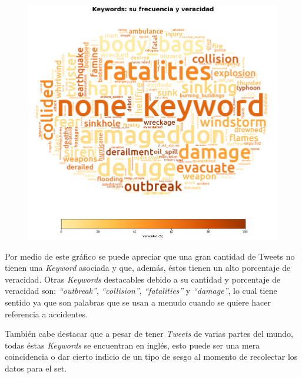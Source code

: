 \documentclass[titlepage,a4paper]{article}
\begin{document}
    \begin{figure}[H]
    \centering
    \includegraphics[width=1\textwidth]{graficos/Analisis de Keyword/keywords_frec_y_veracidad.png}
    \caption{} 
    \end{figure}
    
    Por medio de este gráfico se puede apreciar que una gran cantidad de Tweets no tienen una \textit{Keyword} asociada y que, además, éstos tienen un alto porcentaje de veracidad. Otras \textit{Keywords} destacables debido a su cantidad y porcentaje de veracidad son: \textit{``outbreak''}, \textit{``collision''}, \textit{``fatalities''} y \textit{``damage''}, lo cual tiene sentido ya que son palabras que se usan a menudo cuando se quiere hacer referencia a accidentes. 
    
    También cabe destacar que a pesar de tener \textit{Tweets} de varias partes del mundo, todas éstas \textit{Keywords} se encuentran en inglés, esto puede ser una mera coincidencia o dar cierto indicio de un tipo de sesgo al momento de recolectar los datos para el set. 
    
\end{document}
